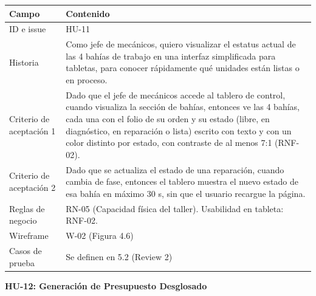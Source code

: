 {\def\LTcaptype{none} %
\begin{longtable}[]{@{}
  >{\raggedright\arraybackslash}p{}
  >{\raggedright\arraybackslash}p{}@{}}
\toprule\noalign{}
\begin{minipage}[b]{\linewidth}\raggedright
\textbf{Campo}
\end{minipage} & \begin{minipage}[b]{\linewidth}\raggedright
\textbf{Contenido}
\end{minipage} \\
\midrule\noalign{}
\endhead
\bottomrule\noalign{}
\endlastfoot
ID e issue & HU-11 \\
Historia & Como jefe de mecánicos, quiero visualizar el estatus actual
de las 4 bahías de trabajo en una interfaz simplificada para tabletas,
para conocer rápidamente qué unidades están listas o en proceso. \\
Criterio de aceptación 1 & Dado que el jefe de mecánicos accede al
tablero de control, cuando visualiza la sección de bahías, entonces
ve las 4 bahías, cada una con el folio de su orden y su estado (libre,
en diagnóstico, en reparación o lista) escrito con texto y con un color
distinto por estado, con contraste de al menos 7:1 (RNF-02). \\
Criterio de aceptación 2 & Dado que se actualiza el estado de una
reparación, cuando cambia de fase, entonces el tablero muestra el nuevo
estado de esa bahía en máximo 30 s, sin que el usuario recargue la
página. \\
Reglas de negocio & RN-05 (Capacidad física del taller). Usabilidad en
tableta: RNF-02. \\
Wireframe & W-02 (Figura 4.6) \\
Casos de prueba & Se definen en 5.2 (Review 2) \\
\end{longtable}
}

\textbf{HU-12: Generación de Presupuesto Desglosado}

